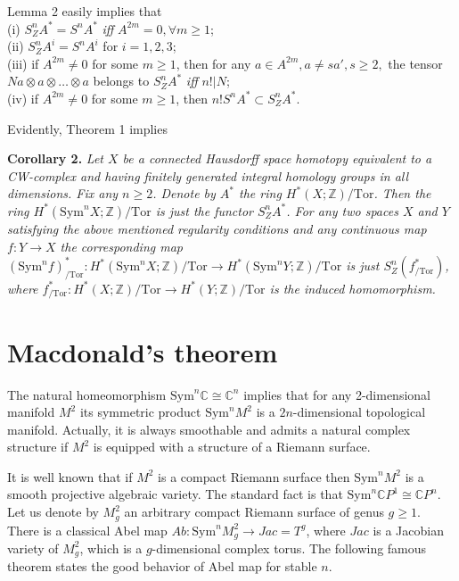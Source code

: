 \documentclass[a4paper,14pt]{article}
\newcommand{\Sym}{\mathrm{Sym}}
\newcommand{\Tor}{\mathrm{Tor}}
\newcommand{\Z}{\mathbb{Z}}
\newcommand{\Cn}{\mathbb{C}}
\begin{document}
\medskip 

Lemma 2 easily implies that \\
(i) $S^n_{Z}A^* = S^n A^*$ {\it iff} $A^{2m}=0, \forall m\ge 1$; \\
(ii) $S^n_{Z}A^i = S^n A^i$ for $i=1,2,3$; \\
(iii) if $A^{2m}\ne 0$ for some $m\ge 1$, then for any $a\in A^{2m}, a\ne s a', s\ge 2,$ the tensor $Na\otimes a\otimes\ldots \otimes a$ belongs to $S^n_{Z}A^*$ {\it iff} $n! | N$; \\
(iv) if $A^{2m}\ne 0$ for some $m\ge 1$, then $n!S^n A^* \subset S^n_{Z}A^*$. 

Evidently, Theorem 1 implies 

\textbf{Corollary 2.}  {\it Let $X$ be a connected Hausdorff space homotopy equivalent to a CW-complex and having finitely generated integral homology groups in all dimensions. Fix any $n\ge 2$. Denote by $A^*$ the ring $H^*(X;\Z)/\Tor$. Then the ring $H^*(\Sym^n X;\Z)/\Tor$ is just the functor $S^n_{Z} A^*$. For any two spaces $X$ and $Y$ satisfying the above mentioned regularity conditions and any continuous map $f\colon Y \to X$ the corresponding map $(\Sym^n f)^*_{/\Tor} \colon H^*(\Sym^n X;\Z)/\Tor \to H^*(\Sym^n Y;\Z)/\Tor$ is just $S^n_{Z} (f^*_{/\Tor})$, where $f^*_{/\Tor} \colon H^*(X;\Z)/\Tor \to H^*(Y;\Z)/\Tor$ is the induced homomorphism.}









\section{Macdonald's theorem}




The natural homeomorphism $\Sym^n \Cn\cong \Cn^n$ implies that for any 2-dimensional manifold $M^2$ its symmetric product $\Sym^nM^2$ is a $2n$-dimensional topological manifold. Actually, it is always smoothable and admits a natural complex structure if $M^2$ is equipped with a structure of a Riemann surface. 

It is well known that if $M^2$ is a compact Riemann surface then $\Sym^n M^2$ is a smooth projective algebraic variety. The standard fact is that $\Sym^n \Cn P^1 \cong \Cn P^n$. Let us denote by $M^2_g$ an arbitrary compact Riemann surface of genus $g\ge 1$. There is a classical Abel map $Ab:\Sym^n M^2_g \to Jac=T^g$, where $Jac$ is a Jacobian variety of $M^2_g$, which is a $g$-dimensional complex torus. The following famous theorem states the good behavior of Abel map for stable $n$.
\end{document}
